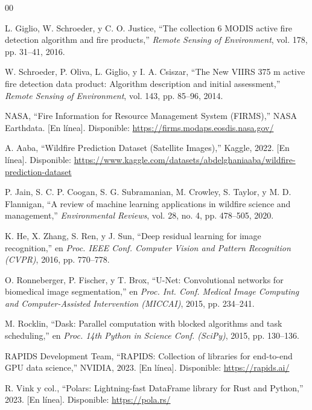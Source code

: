 \begin{thebibliography}{00}

L. Giglio, W. Schroeder, y C. O. Justice, ``The collection 6 MODIS active fire detection algorithm and fire products,'' \textit{Remote Sensing of Environment}, vol. 178, pp. 31--41, 2016.

W. Schroeder, P. Oliva, L. Giglio, y I. A. Csiszar, ``The New VIIRS 375 m active fire detection data product: Algorithm description and initial assessment,'' \textit{Remote Sensing of Environment}, vol. 143, pp. 85--96, 2014.

NASA, ``Fire Information for Resource Management System (FIRMS),'' NASA Earthdata. [En línea]. Disponible: \url{https://firms.modaps.eosdis.nasa.gov/}

A. Aaba, ``Wildfire Prediction Dataset (Satellite Images),'' Kaggle, 2022. [En línea]. Disponible: \url{https://www.kaggle.com/datasets/abdelghaniaaba/wildfire-prediction-dataset}

P. Jain, S. C. P. Coogan, S. G. Subramanian, M. Crowley, S. Taylor, y M. D. Flannigan, ``A review of machine learning applications in wildfire science and management,'' \textit{Environmental Reviews}, vol. 28, no. 4, pp. 478--505, 2020.

K. He, X. Zhang, S. Ren, y J. Sun, ``Deep residual learning for image recognition,'' en \textit{Proc. IEEE Conf. Computer Vision and Pattern Recognition (CVPR)}, 2016, pp. 770--778.

O. Ronneberger, P. Fischer, y T. Brox, ``U-Net: Convolutional networks for biomedical image segmentation,'' en \textit{Proc. Int. Conf. Medical Image Computing and Computer-Assisted Intervention (MICCAI)}, 2015, pp. 234--241.

M. Rocklin, ``Dask: Parallel computation with blocked algorithms and task scheduling,'' en \textit{Proc. 14th Python in Science Conf. (SciPy)}, 2015, pp. 130--136.

RAPIDS Development Team, ``RAPIDS: Collection of libraries for end-to-end GPU data science,'' NVIDIA, 2023. [En línea]. Disponible: \url{https://rapids.ai/}

R. Vink y col., ``Polars: Lightning-fast DataFrame library for Rust and Python,'' 2023. [En línea]. Disponible: \url{https://pola.rs/}


\end{thebibliography}
